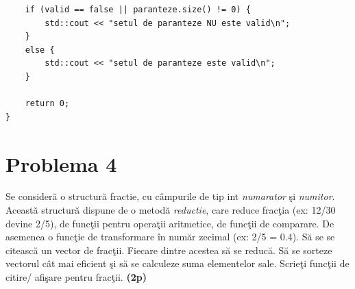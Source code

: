 \documentclass[12pt]{book}
\begin{document}
\begin{lstlisting}
    if (valid == false || paranteze.size() != 0) {
        std::cout << "setul de paranteze NU este valid\n";
    }
    else {
        std::cout << "setul de paranteze este valid\n";
    }

    return 0;
}
\end{lstlisting}

\newpage

\section*{Problema 4}
Se consideră o structură fractie, cu câmpurile de tip int \textit{numarator} şi \textit{numitor}. Această structură dispune de o metodă \textit{reductie}, care reduce fracţia (ex: 12/30 devine 2/5), de funcţii pentru operaţii aritmetice, de funcţii de comparare. De asemenea o funcţie de transformare în număr zecimal (ex: 2/5 = 0.4). Să se se citească un vector de fracţii. Fiecare dintre acestea să se reducă. Să se sorteze vectorul cât mai eficient şi să se calculeze suma elementelor sale. Scrieţi funcţii de citire/ afişare pentru fracţii. \textbf{(2p)} \newline
\end{document}
